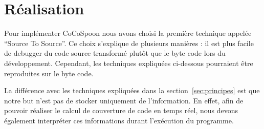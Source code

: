 \section{Réalisation}

Pour implémenter CoCoSpoon nous avons choisi la première technique appelée “Source To Source”\cite{baxter}. Ce choix s'explique de plusieurs manières : il est plus facile de debugger du code source transformé plutôt que le byte code lors du développement. Cependant, les techniques expliquées ci-dessous pourraient être reproduites sur le byte code. \par La différence avec les techniques expliquées dans la section~\ref{sec:principes} est que notre but n'est pas de stocker uniquement de l'information. En effet, afin de pouvoir réaliser le calcul de couverture de code en temps réel, nous devons également interpréter ces informations durant l'exécution du programme. 
